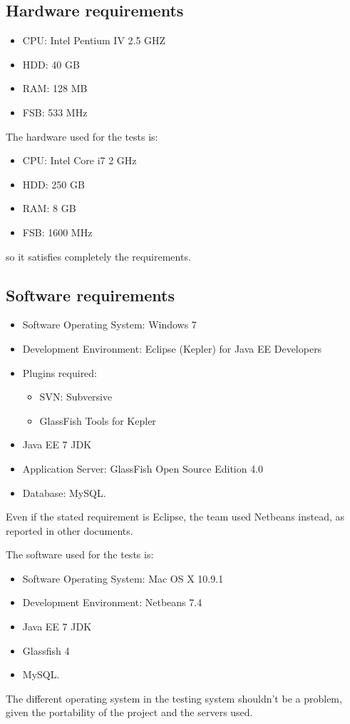 \documentclass[a4paper,12pt]{book}
\begin{document}
\subsection{Hardware requirements}
\begin{itemize}
  \item CPU: Intel Pentium IV 2.5 GHZ
  \item HDD: 40 GB
  \item RAM: 128 MB
  \item FSB: 533 MHz
\end{itemize}
The hardware used for the tests is:
\begin{itemize}
  \item CPU: Intel Core i7 2 GHz
  \item HDD: 250 GB
  \item RAM: 8 GB
  \item FSB: 1600 MHz
\end{itemize}
so it satisfies completely the requirements.

\subsection{Software requirements}
\begin{itemize}
  \item Software Operating System: Windows 7
  \item Development Environment: Eclipse (Kepler) for Java EE Developers
  \item Plugins required:
  \begin{itemize}
    \item SVN: Subversive
    \item GlassFish Tools for Kepler
  \end{itemize}
  \item Java EE 7 JDK
  \item Application Server: GlassFish Open Source Edition 4.0 \item Database: MySQL.
\end{itemize}
Even if the stated requirement is Eclipse, the team used Netbeans instead, as reported in other documents.

The software used for the tests is:
\begin{itemize}
  \item Software Operating System: Mac OS X 10.9.1
  \item Development Environment: Netbeans 7.4
  \item Java EE 7 JDK
  \item Glassfish 4
  \item MySQL.
\end{itemize}
The different operating system in the testing system shouldn't be a problem, given the portability of the project and the servers used.
\end{document}
